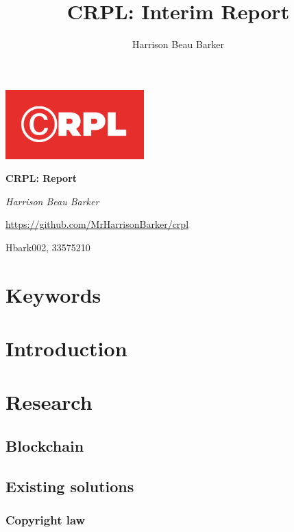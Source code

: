 \documentclass[12pt]{article}
\title{CRPL: Interim Report}
\author{Harrison Beau Barker}
\begin{document}
\begin{titlepage}
	\centering
	\includegraphics[width=0.4\textwidth]{crpl}\par
	\vspace{1cm}
	{\huge\bfseries CRPL: Report\par}
	\vspace{2cm}
	{\Large\itshape Harrison Beau Barker\par}
	\vfill
	{\url{https://github.com/MrHarrisonBarker/crpl}\par}
	\vspace{1cm}
	{\large Hbark002, 33575210\par}
\end{titlepage}


\tableofcontents{}

\section{Keywords}

\section{Introduction}

\section{Research}
\subsection{Blockchain}

\subsection{Existing solutions}

\subsubsection{Copyright law}
\end{document}
